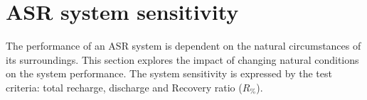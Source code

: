 %
%
%
%
%

\section{ASR system sensitivity}
\label{section:sens_analysis}
The performance of an ASR system is dependent on the natural circumstances of its surroundings. This section explores the impact of changing natural conditions on the system performance. The system sensitivity is expressed by the test criteria: total recharge, discharge and Recovery ratio ($R_{\%}$).

